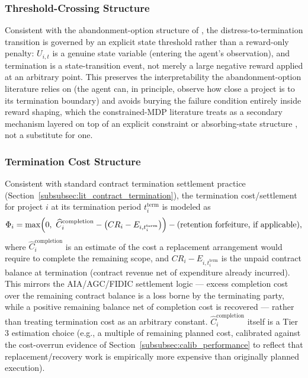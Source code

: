 \subsubsection{Threshold-Crossing Structure}
\label{subsubsec:model_threshold}

Consistent with the abandonment-option structure of \cite{dixitpindyck1994investment}, the distress-to-termination transition is governed by an explicit state threshold rather than a reward-only penalty: $U_{i,t}$ is a genuine state variable (entering the agent's observation), and termination is a state-transition event, not merely a large negative reward applied at an arbitrary point. This preserves the interpretability the abandonment-option literature relies on (the agent can, in principle, observe how close a project is to its termination boundary) and avoids burying the failure condition entirely inside reward shaping, which the constrained-MDP literature treats as a secondary mechanism layered on top of an explicit constraint or absorbing-state structure \cite{borkarjain2014riskconstrained}, not a substitute for one.

\subsubsection{Termination Cost Structure}
\label{subsubsec:model_termination_cost}

Consistent with standard contract termination settlement practice (Section~\ref{subsubsec:lit_contract_termination}), the termination cost/settlement for project $i$ at its termination period $t_i^{\mathrm{term}}$ is modeled as
\[
\Phi_i = \max\Bigl(0,\ \widehat{C}_i^{\mathrm{completion}} - \bigl(CR_i - E_{i,t_i^{\mathrm{term}}}\bigr)\Bigr) - \text{(retention forfeiture, if applicable)},
\]
where $\widehat{C}_i^{\mathrm{completion}}$ is an estimate of the cost a replacement arrangement would require to complete the remaining scope, and $CR_i - E_{i,t_i^{\mathrm{term}}}$ is the unpaid contract balance at termination (contract revenue net of expenditure already incurred). This mirrors the AIA/AGC/FIDIC settlement logic — excess completion cost over the remaining contract balance is a loss borne by the terminating party, while a positive remaining balance net of completion cost is recovered — rather than treating termination cost as an arbitrary constant. $\widehat{C}_i^{\mathrm{completion}}$ itself is a Tier 3 estimation choice (e.g., a multiple of remaining planned cost, calibrated against the cost-overrun evidence of Section~\ref{subsubsec:calib_performance} to reflect that replacement/recovery work is empirically more expensive than originally planned execution).

